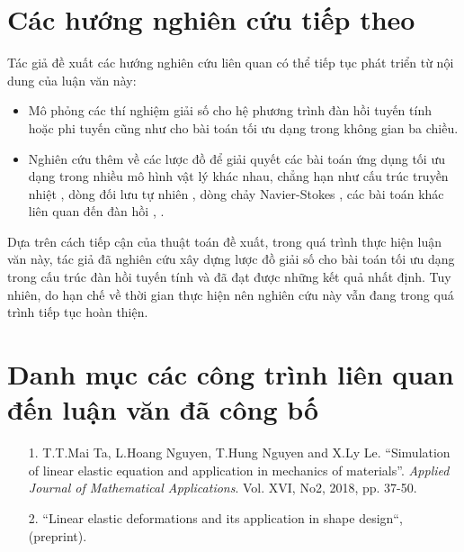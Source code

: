 \documentclass[
12pt, %
oneside, %
english, %
onehalfspacing, %
nolistspacing, %
headsepline, %
addchap,
]{MastersDoctoralThesis} %
\begin{document}
\chapter*{\centering Các hướng nghiên cứu tiếp theo}
Tác giả đề xuất các hướng nghiên cứu liên quan có thể tiếp tục phát triển từ nội dung của luận văn này:
\begin{itemize}
\item Mô phỏng các thí nghiệm giải số cho hệ phương trình đàn hồi tuyến tính hoặc phi tuyến cũng như cho bài toán tối ưu dạng trong không gian ba chiều.
\item Nghiên cứu thêm về các lược đồ để giải quyết các bài toán ứng dụng tối ưu dạng trong nhiều mô hình vật lý khác nhau, chẳng hạn như cấu trúc truyền nhiệt \cite{YWM13}, dòng đối lưu tự nhiên \cite{AAA+14}, dòng chảy Navier-Stokes \cite{DMZ08b}, các bài toán khác liên quan đến đàn hồi \citep{TG85}, \citep{Sad05}.
\end{itemize}

Dựa trên cách tiếp cận của thuật toán đề xuất, trong quá trình thực hiện luận văn này, tác giả đã nghiên cứu xây dựng lược đồ giải số cho bài toán tối ưu dạng trong cấu trúc đàn hồi tuyến tính và đã đạt được những kết quả nhất định. Tuy nhiên, do hạn chế về thời gian thực hiện nên nghiên cứu này vẫn đang trong quá trình tiếp tục hoàn thiện.

\chapter*{\centering Danh mục các công trình liên quan đến luận văn đã công bố}
\begin{itemize}
\item[1.] T.T.Mai Ta, L.Hoang Nguyen, T.Hung Nguyen and X.Ly Le. “Simulation of linear elastic equation and application in mechanics of materials”. \textit{Applied Journal of Mathematical Applications}. Vol. XVI, No2, 2018, pp. 37-50.
\item[2.] “Linear elastic deformations and its application in shape design“, (preprint).
\end{itemize}

\printbibliography
{}


\end{document}

